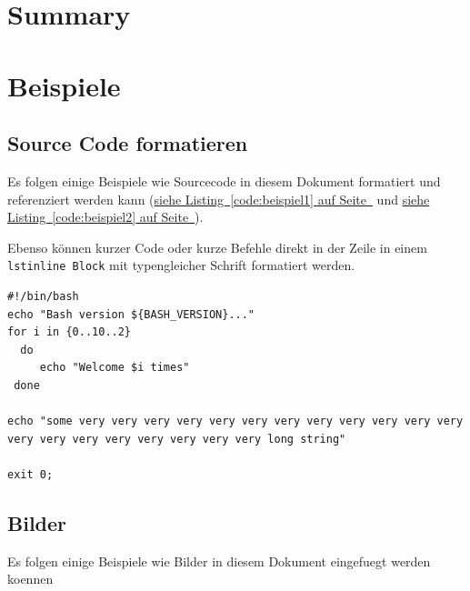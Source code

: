 \documentclass[12pt,a4paper,titlepage,oneside]{scrartcl}
\begin{document}
\section{Summary}


\section{Beispiele}
\subsection{Source Code formatieren}
Es folgen einige Beispiele wie Sourcecode in diesem Dokument formatiert und referenziert werden kann
(\hyperref[code:beispiel1]{siehe Listing~\ref*{code:beispiel1} auf Seite~\pageref*{code:beispiel1}} und \hyperref[code:beispiel2]{siehe Listing~\ref*{code:beispiel2} auf Seite~\pageref*{code:beispiel2}}).

Ebenso können kurzer Code oder kurze Befehle direkt in der Zeile in einem \lstinline{lstinline Block} mit typengleicher Schrift formatiert werden.



\begin{lstlisting}[caption=Example bash script,label=code:beispiel2,style=simple]
#!/bin/bash
echo "Bash version ${BASH_VERSION}..."
for i in {0..10..2}
  do
     echo "Welcome $i times"
 done

echo "some very very very very very very very very very very very very very very very very very very very very long string"

exit 0;
\end{lstlisting}

\subsection{Bilder}

Es folgen einige Beispiele wie Bilder in diesem Dokument eingefuegt werden koennen



%
%
\end{document}
